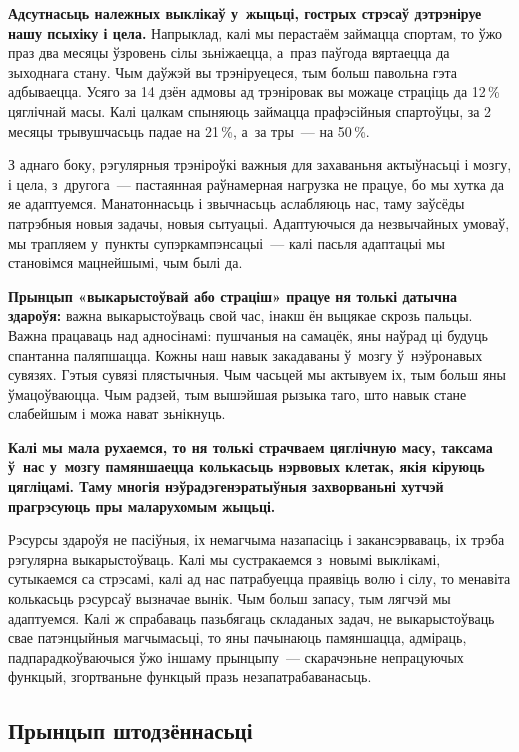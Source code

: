 \textbf{Адсутнасьць належных выклікаў у~жыцьці, гострых стрэсаў дэтрэніруе нашу псыхіку і цела.} Напрыклад, калі мы перастаём займацца спортам, то ўжо праз два месяцы ўзровень сілы зьніжаецца, а~праз паўгода вяртаецца да зыходнага стану. Чым даўжэй вы трэніруецеся, тым больш павольна гэта адбываецца. Усяго за 14 дзён адмовы ад трэніровак вы можаце страціць да 12\,\% цяглічнай масы. Калі цалкам спыняюць займацца прафэсійныя спартоўцы, за 2 месяцы трывушчасьць падае на 21\,\%, а~за тры~--- на 50\,\%.

З аднаго боку, рэгулярныя трэніроўкі важныя для захаваньня актыўнасьці і мозгу, і цела, з~другога~--- пастаянная раўнамерная нагрузка не працуе, бо мы хутка да яе адаптуемся. Манатоннасьць і звычнасьць аслабляюць нас, таму заўсёды патрэбныя новыя задачы, новыя сытуацыі. Адаптуючыся да незвычайных умоваў, мы трапляем у~пункты супэркампэнсацыі~--- калі пасьля адаптацыі мы становімся мацнейшымі, чым былі да.

\textbf{Прынцып «выкарыстоўвай або страціш» працуе ня толькі датычна здароўя:} важна выкарыстоўваць свой час, інакш ён выцякае скрозь пальцы. Важна працаваць над адносінамі: пушчаныя на самацёк, яны наўрад ці будуць спантанна паляпшацца. Кожны наш навык закадаваны ў~мозгу ў~нэўронавых сувязях. Гэтыя сувязі плястычныя. Чым часьцей мы актывуем іх, тым больш яны ўмацоўваюцца. Чым радзей, тым вышэйшая рызыка таго, што навык стане слабейшым і можа нават зьнікнуць.

\textbf{Калі мы мала рухаемся, то ня толькі страчваем цяглічную масу, таксама ў~нас у~мозгу памяншаецца колькасьць нэрвовых клетак, якія кіруюць цягліцамі. Таму многія нэўрадэгенэратыўныя захворваньні хутчэй прагрэсуюць пры маларухомым жыцьці.}

Рэсурсы здароўя не пасіўныя, іх немагчыма назапасіць і закансэрваваць, іх трэба рэгулярна выкарыстоўваць. Калі мы сустракаемся з~новымі выклікамі, сутыкаемся са стрэсамі, калі ад нас патрабуецца праявіць волю і сілу, то менавіта колькасьць рэсурсаў вызначае вынік. Чым больш запасу, тым лягчэй мы адаптуемся. Калі ж спрабаваць пазьбягаць складаных задач, не выкарыстоўваць свае патэнцыйныя магчымасьці, то яны пачынаюць памяншацца, адміраць, падпарадкоўваючыся ўжо іншаму прынцыпу~--- скарачэньне непрацуючых функцый, згортваньне функцый празь незапатрабаванасьць.

\subsection*{Прынцып штодзённасьці}

